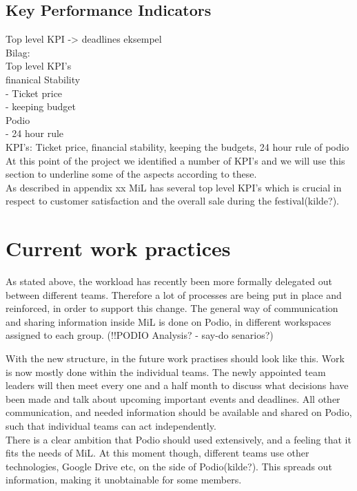 \subsection{Key Performance Indicators}
Top level KPI -> deadlines eksempel\\

Bilag:\\
Top level KPI's\\
finanical Stability\\
	- Ticket price\\
	- keeping budget\\
Podio\\
- 24 hour rule\\

KPI's: Ticket price, financial stability, keeping the budgets, 24 hour rule of podio\\

At this point of the project we identified a number of KPI's and we will use this section to underline some of the aspects according to these.\\
As described in appendix xx MiL has several top level KPI's which is crucial in respect to customer satisfaction and the overall sale during the festival(kilde?). 

\section{Current work practices}
As stated above, the workload has recently been more formally delegated out between different teams. Therefore a lot of processes are being put in place and reinforced, in order to support this change. The general way of communication and sharing information inside MiL is done on Podio, in different workspaces assigned to each group. (!!PODIO Analysis? - say-do senarios?) \

With the new structure, in the future work practises should look like this. Work is now mostly done within the individual teams. The newly appointed team leaders will then meet every one and a half month to discuss what decisions have been made and talk about upcoming important events and deadlines. All other communication, and needed information should be available and shared on Podio, such that individual teams can act independently.\\

There is a clear ambition that Podio should used extensively, and a feeling that it fits the needs of MiL. At this moment though, different teams use other technologies, Google Drive etc, on the side of Podio(kilde?). This spreads out information, making it unobtainable for some members. \

